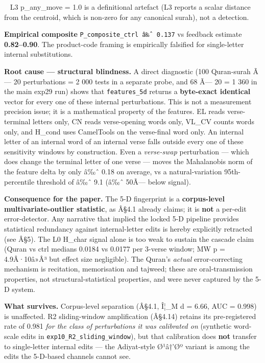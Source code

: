 \documentclass[
]{article}
\begin{document}
~ L3 p\_any\_move = 1.0 is a definitional artefact (L3 reports a scalar
distance from the centroid, which is non-zero for any canonical surah),
not a detection.

\textbf{Empirical composite} \texttt{P\_composite\_ctrl\ â‰ˆ\ 0.137} vs
feedback estimate \textbf{0.82--0.90}. The product-code framing is
empirically falsified for single-letter internal substitutions.

\textbf{Root cause --- structural blindness.} A direct diagnostic (100
Quran-surah Ã--- 20 perturbations = 2 000 tests in a separate probe, and
68 Ã--- 20 = 1 360 in the main exp29 run) shows that
\texttt{features\_5d} returns a \textbf{byte-exact identical} vector for
every one of these internal perturbations. This is not a measurement
precision issue; it is a mathematical property of the features. EL reads
verse-terminal letters only, CN reads verse-opening words only, VL\_CV
counts words only, and H\_cond uses CamelTools on the verse-final word
only. An internal letter of an internal word of an internal verse falls
outside every one of these sensitivity windows by construction. Even a
\emph{verse-swap} perturbation --- which does change the terminal letter
of one verse --- moves the Mahalanobis norm of the feature delta by only
â‰ˆ 0.18 on average, vs a natural-variation 95th-percentile threshold of
â‰ˆ 9.1 (â‰ˆ 50Ã--- below signal).

\textbf{Consequence for the paper.} The 5-D fingerprint is a
\textbf{corpus-level multivariate-outlier statistic}, as Â§4.1 already
claims; it is \textbf{not} a per-edit error-detector. Any narrative that
implied the locked 5-D pipeline provides statistical redundancy against
internal-letter edits is hereby explicitly retracted (see Â§5). The L0
H\_char signal alone is too weak to sustain the cascade claim (Quran vs
ctrl medians 0.0184 vs 0.0177 per 3-verse window; MW p = 4.9Â·10â»Â³ but
effect size negligible). The Quran's \emph{actual} error-correcting
mechanism is recitation, memorisation and tajweed; these are
oral-transmission properties, not structural-statistical properties, and
were never captured by the 5-D system.

\textbf{What survives.} Corpus-level separation (Â§4.1, Î¦\_M d = 6.66,
AUC = 0.998) is unaffected. R2 sliding-window amplification (Â§4.14)
retains its pre-registered rate of 0.981 \emph{for the class of
perturbations it was calibrated on} (synthetic word-scale edits in
\texttt{exp10\_R2\_sliding\_window}), but that calibration does
\textbf{not} transfer to single-letter internal edits --- the
Adiyat-style Ø¹â†'Øº variant is among the edits the 5-D-based channels
cannot see.
\end{document}
